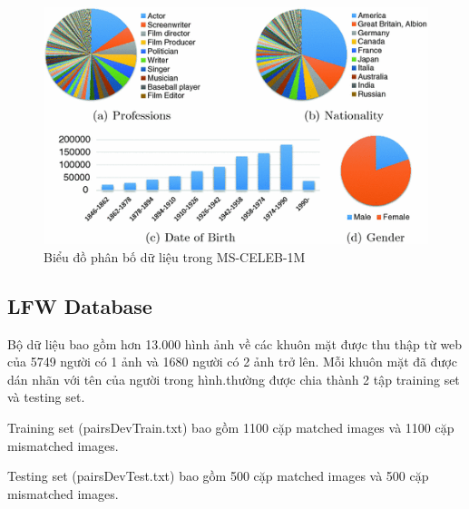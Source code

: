 \documentclass[a4paper, 12pt]{article}
\begin{document}
    \begin{figure}[H]
        \begin{center}
            \includegraphics[scale=0.5]{img/MS-CELEB-1M.png}
            \caption{Biểu đồ phân bố dữ liệu trong MS-CELEB-1M}
        \end{center}
    \end{figure}

\subsection{LFW Database}
Bộ dữ liệu bao gồm hơn 13.000 hình ảnh về các khuôn mặt được thu thập từ web của 5749 người có 1 ảnh và 1680 người có 2 ảnh trở lên. Mỗi khuôn mặt đã được dán nhãn với tên của người trong hình.thường được chia thành 2 tập training set và testing set. 

Training set (pairsDevTrain.txt) bao gồm 1100 cặp matched images và 1100 cặp mismatched images.

Testing set (pairsDevTest.txt) bao gồm 500 cặp matched images và 500 cặp mismatched images.
\end{document}
